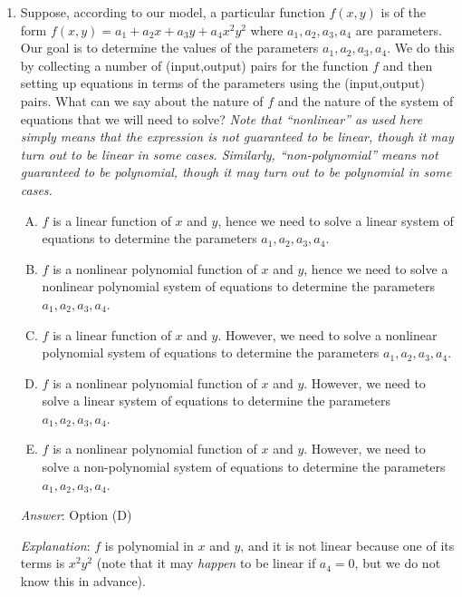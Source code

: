 \documentclass[10pt]{amsart}
\begin{document}
\begin{enumerate}
  {\em Performance review}: $9$ out of $27$ got this. $14$ chose (A),
  $3$ chose (D), $1$ chose (C).

  {\em Historical note (last time)}: $6$ out of $29$ got
  this. $15$ chose (A), $6$ chose (C), $1$ each chose (B) and (D).

\item Suppose, according to our model, a particular function $f(x,y)$
  is of the form $f(x,y) = a_1 + a_2x + a_3y + a_4x^2y^2$ where
  $a_1,a_2,a_3,a_4$ are parameters. Our goal is to determine the
  values of the parameters $a_1,a_2,a_3,a_4$. We do this by collecting
  a number of (input,output) pairs for the function $f$ and then
  setting up equations in terms of the parameters using the
  (input,output) pairs. What can we say about the nature of $f$ and
  the nature of the system of equations that we will need to solve?
  {\em Note that ``nonlinear'' as used here simply means that the
    expression is not guaranteed to be linear, though it may turn out
    to be linear in some cases. Similarly, ``non-polynomial'' means
    not guaranteed to be polynomial, though it may turn out to be
    polynomial in some cases.}

  \begin{enumerate}[(A)]
  \item $f$ is a linear function of $x$ and $y$, hence we need to
    solve a linear system of equations to determine the parameters
    $a_1,a_2,a_3,a_4$.
  \item $f$ is a nonlinear polynomial function of $x$ and $y$, hence
    we need to solve a nonlinear polynomial system of equations to
    determine the parameters $a_1,a_2,a_3,a_4$.
  \item $f$ is a linear function of $x$ and $y$. However, we need to
    solve a nonlinear polynomial system of equations to determine the
    parameters $a_1,a_2,a_3,a_4$.
  \item $f$ is a nonlinear polynomial function of $x$ and
    $y$. However, we need to solve a linear system of equations to
    determine the parameters $a_1,a_2,a_3,a_4$.
  \item $f$ is a nonlinear polynomial function of $x$ and
    $y$. However, we need to solve a non-polynomial system of
    equations to determine the parameters $a_1,a_2,a_3,a_4$.
  \end{enumerate}

  {\em Answer}: Option (D)

  {\em Explanation}: $f$ is polynomial in $x$ and $y$, and it is not
  linear because one of its terms is $x^2y^2$ (note that it may {\em
    happen} to be linear if $a_4 = 0$, but we do not know this in
  advance).


\end{enumerate}
\end{document}

